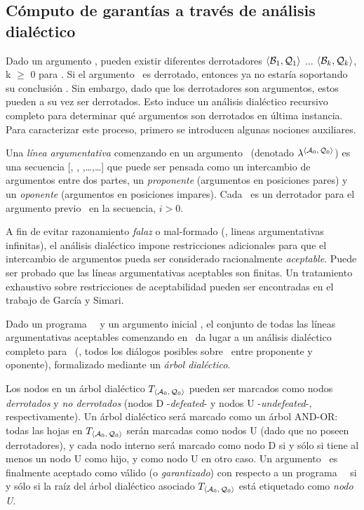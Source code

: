 \subsection{Cómputo de garantías a través de análisis dialéctico}
\label{sub:computo_garantias}
 
 Dado un argumento \AQ, pueden existir diferentes derrotadores $\mbox{$\langle \mbox{${\mathcal B_1}$},\mbox{${\mathcal Q_1}$} \rangle $}$
 $\ldots$ $\mbox{$\langle \mbox{${\mathcal B_k}$},\mbox{${\mathcal Q_k}$} \rangle $}$, k $\ge$ 0 para \AQ. Si el argumento \AQ\ es
 derrotado, entonces ya no estaría soportando su conclusión \ArgQ.  Sin
 embargo, dado que los derrotadores son argumentos, estos pueden a su
 vez ser derrotados. Esto  induce un análisis dialéctico recursivo
 completo para determinar qué argumentos son derrotados en  última
 instancia. Para caracterizar este proceso, primero se introducen
 algunas nociones auxiliares.
 
 Una \textit{línea argumentativa} comenzando en un argumento \AoQo\
 (denotado $\lambda^{\scriptsize \mbox{$\langle \mbox{${\mathcal A_0}$},\mbox{${\mathcal Q_0}$} \rangle $}}$) es una secuencia [\AoQo,
 \AaQa, \AbQb,\ldots,\AnQn\ldots] que puede ser pensada como un
 intercambio de  argumentos entre dos partes, un \textit{proponente}
 (argumentos en posiciones pares) y un \textit{oponente} (argumentos en
 posiciones impares). Cada \AiQi\ es un derrotador para el argumento
 previo \AimQim\ en la secuencia, $i > 0$.
 
 A fin de evitar razonamiento \textit{falaz} o mal-formado (\eg ,
 lineas argumentativas infinitas), el  análisis dialéctico impone
 restricciones adicionales para que el intercambio de argumentos pueda
 ser  considerado racionalmente \textit{aceptable}. Puede ser probado
 que las líneas argumentativas aceptables  son finitas. Un tratamiento
 exhaustivo sobre restricciones de aceptabilidad pueden ser encontradas
 en el trabajo de García y Simari\cite{delp04}.
 
 Dado un programa \DLP\ \PP\ y un argumento inicial \AoQo, el conjunto
 de todas las líneas argumentativas aceptables comenzando en \AoQo\ da
 lugar a un análisis dialéctico completo para \AoQo\ (\ie, todos los
 diálogos posibles sobre \AoQo\ entre proponente y oponente),
 formalizado mediante un \textit{árbol dialéctico}.
 
 Los nodos en un árbol dialéctico $T_{\scriptsize \mbox{$\langle \mbox{${\mathcal A_0}$},\mbox{${\mathcal Q_0}$} \rangle $}}$ pueden ser
 marcados como nodos \textit{derrotados}  y \textit{no derrotados}
 (nodos D -\textit{defeated}- y nodos U -\textit{undefeated}-,
 respectivamente).  Un árbol dialéctico será marcado como un árbol
 {\footnotesize AND-OR}: todas las hojas en  $T_{\scriptsize \mbox{$\langle \mbox{${\mathcal A_0}$},\mbox{${\mathcal Q_0}$} \rangle $}}$
 serán marcadas como nodos U (dado que no poseen derrotadores), y cada
 nodo interno  será marcado como nodo D si y sólo si tiene al menos un
 nodo U como hijo, y como nodo U en otro caso.  Un argumento \AoQo\ es
 finalmente aceptado como válido (o \textit{garantizado}) con respecto
 a un programa  \DLP\ \PP\  si y sólo si la raíz del árbol dialéctico
 asociado $T_{\scriptsize \mbox{$\langle \mbox{${\mathcal A_0}$},\mbox{${\mathcal Q_0}$} \rangle $}}$ está etiquetado como \textit{nodo U}.
 
